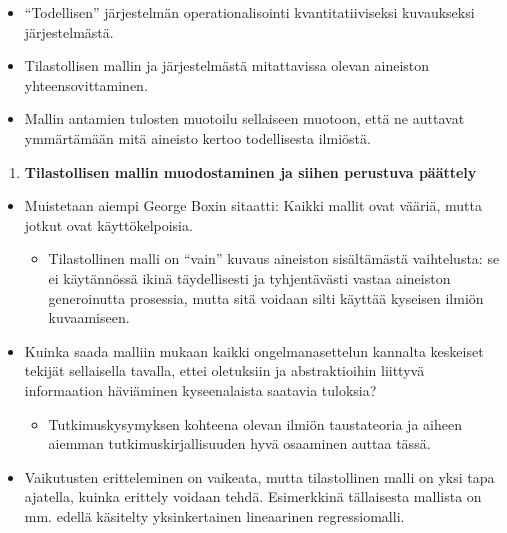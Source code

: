 \documentclass[
]{book}
\providecommand{\tightlist}{%
  \setlength{\itemsep}{0pt}\setlength{\parskip}{0pt}}
\begin{document}
\begin{itemize}
  \begin{itemize}
  \tightlist
  \item
    ``Todellisen'' järjestelmän operationalisointi kvantitatiiviseksi kuvaukseksi järjestelmästä.
  \item
    Tilastollisen mallin ja järjestelmästä mitattavissa olevan aineiston yhteensovittaminen.
  \item
    Mallin antamien tulosten muotoilu sellaiseen muotoon, että ne auttavat ymmärtämään mitä aineisto kertoo todellisesta ilmiöstä.
  \end{itemize}
\end{itemize}

\begin{enumerate}
\def\labelenumi{\arabic{enumi}.}
\setcounter{enumi}{2}
\tightlist
\item
  \textbf{Tilastollisen mallin muodostaminen ja siihen perustuva päättely}
\end{enumerate}

\begin{itemize}
\tightlist
\item
  Muistetaan aiempi George Boxin sitaatti: Kaikki mallit ovat vääriä, mutta jotkut ovat käyttökelpoisia.

  \begin{itemize}
  \tightlist
  \item
    Tilastollinen malli on ``vain'' kuvaus aineiston sisältämästä vaihtelusta: se ei käytännössä ikinä täydellisesti ja tyhjentävästi vastaa aineiston generoinutta prosessia, mutta sitä voidaan silti käyttää kyseisen ilmiön kuvaamiseen.\\
  \end{itemize}
\item
  Kuinka saada malliin mukaan kaikki ongelmanasettelun kannalta keskeiset tekijät sellaisella tavalla, ettei oletuksiin ja abstraktioihin liittyvä informaation häviäminen kyseenalaista saatavia tuloksia?

  \begin{itemize}
  \tightlist
  \item
    Tutkimuskysymyksen kohteena olevan ilmiön taustateoria ja aiheen aiemman tutkimuskirjallisuuden hyvä osaaminen auttaa tässä.
  \end{itemize}
\item
  Vaikutusten eritteleminen on vaikeata, mutta tilastollinen malli on yksi tapa ajatella, kuinka erittely voidaan tehdä. Esimerkkinä tällaisesta mallista on mm. edellä käsitelty yksinkertainen lineaarinen regressiomalli.
\end{itemize}
\end{document}
